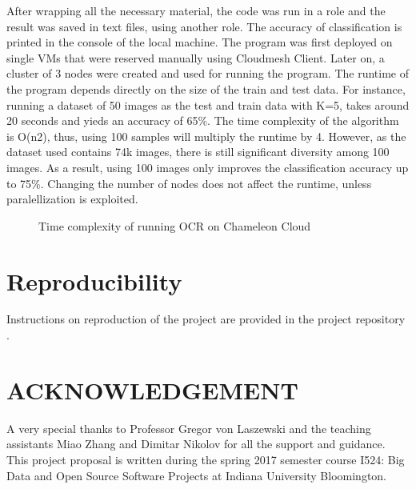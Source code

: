 \documentclass[9pt,twocolumn,twoside]{../../styles/osajnl}
\begin{document}
After wrapping all the necessary material, the code was run in a role and the result
was saved in text files, using another role. The accuracy of classification is printed
in the console of the local machine.
The program was first deployed on single VMs that were reserved manually using 
Cloudmesh Client. Later on, a cluster of 3 nodes were created and used for running
the program. The runtime of the program depends directly on the size of the train and 
test data.  For instance, running a dataset of 50 images as the test and train data
with K=5, takes around 20 seconds and yieds an accuracy of 65\%. The time complexity
of the algorithm is O(n2), thus, using 100 samples will multiply the runtime by 4. 
However, as the dataset used contains 74k images, there is still significant diversity
among 100 images. As a result, using 100 images only improves the classification 
accuracy up to 75\%. Changing the number of nodes does not affect the runtime, unless paralellization
is exploited.

\begin{figure}[H]
\centering
{}
\caption{Time complexity of running OCR on Chameleon Cloud}
\end{figure}

\section{Reproducibility}
Instructions on reproduction of the project are provided in the project 
repository \cite{git-self-code}.


\section{ACKNOWLEDGEMENT}
A very special thanks to Professor Gregor von Laszewski and the
teaching assistants Miao Zhang and Dimitar Nikolov for all the support
and guidance. This project proposal is written during the spring 2017
semester course {I524: Big Data and Open Source Software Projects} at
Indiana University Bloomington.
\end{document}
